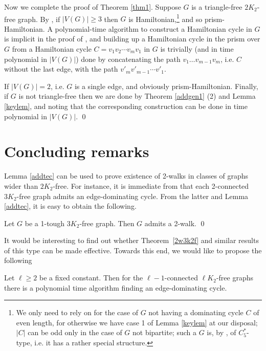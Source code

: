 \documentclass[runningheads,a4paper]{llncs}
\begin{document}
Now we complete the proof of Theorem \ref{thm1}.
Suppose $G$ is a triangle-free $2K_2$-free graph. By \cite[Theorem 4]{broersma2014toughness},
if $|V(G)|\geq 3$ then
$G$ is Hamiltonian,\footnote{
We only need to rely on  \cite[Theorem 4]{broersma2014toughness}
for the case of $G$ not having a dominating cycle $C$ of even length, for
otherwise we have case 1 of Lemma \ref{keylem} at our disposal; $|C|$ can be odd
only in the case of $G$ not bipartite; such a $G$ is, by \cite[Lemma 2]{broersma2014toughness},
of $C_5^*$-type, i.e. it has a rather special structure.}
and so prism-Hamiltonian.
A polynomial-time algorithm to construct a Hamiltonian cycle in $G$ is
implicit in the proof of  \cite[Theorem 4]{broersma2014toughness}, and
building up a Hamiltonian cycle in the prism over $G$ from a Hamiltonian
cycle $C=v_1v_2\cdots v_{m}v_1$ in $G$ is trivially (and in time polynomial in $|V(G)|$)
done by concatenating the path $v_1\dots v_{m-1}v_m$, i.e. $C$ without the last edge, with the
path $v'_m v'_{m-1}\cdots v'_1$.

If $|V(G)|=2$, i.e. $G$ is a single edge, and obviously prism-Hamiltonian.
Finally, if $G$ is not triangle-free then we are done by
Theorem \ref{addgen1} (2) and Lemma \ref{keylem}, and noting that the
corresponding construction can be done in  time polynomial in $|V(G)|$.
\qed

\section{Concluding remarks}

Lemma \ref{addtec} can be used to prove existence of 2-walks in
classes of graphs wider than $2K_2$-free.
For instance, it is immediate from \cite[Corollary 3.2]{veldman83} that each 2-connected
$3K_2$-free graph admits  an edge-dominating cycle. From the latter and Lemma \ref{addtec},
it is easy to obtain the following.
\begin{theorem}\label{2w3k2f}
Let $G$ be a 1-tough $3K_2$-free graph. Then $G$ admits a 2-walk. \qed
\end{theorem}

It would be interesting to find out whether Theorem~\ref{2w3k2f} and similar results
of this type can be made
effective. Towards this end, we would like to propose the following
\begin{conjecture}
Let $\ell\geq 2$ be a fixed constant.
Then for the $\ell-1$-connected $\ell K_2$-free
graphs there is a polynomial time algorithm finding an edge-dominating cycle.
\end{conjecture}
\end{document}
